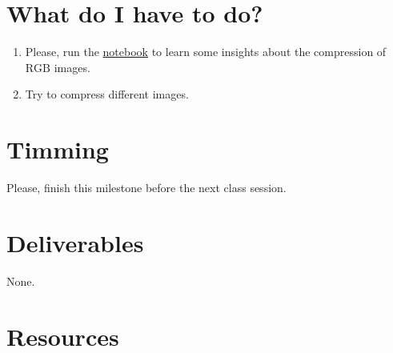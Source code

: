 
\section{What do I have to do?}

\begin{enumerate}
\item Please, run the
  \href{https://github.com/Sistemas-Multimedia/Sistemas-Multimedia.github.io/blob/master/contents/RGB_quantization/RD_performance.ipynb}{notebook}
  to learn some insights about the compression of $\text{RGB}$ images.
\item Try to compress different images.
\end{enumerate}

\section{Timming}

Please, finish this milestone before the next class session.

\section{Deliverables}

None.

\section{Resources}

\renewcommand{\addcontentsline}[3]{}%

